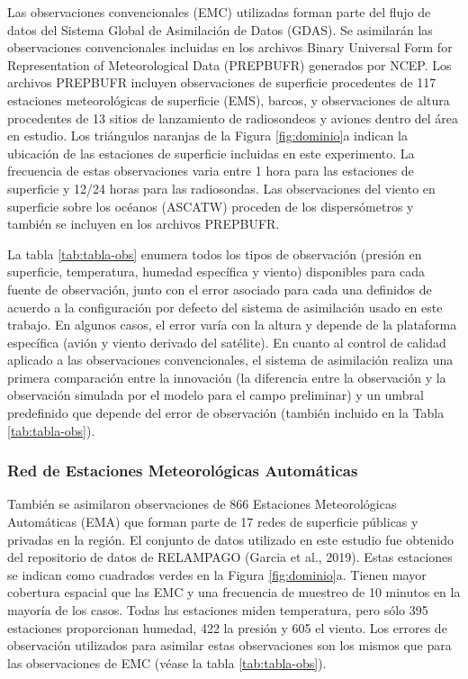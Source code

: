 \documentclass[12pt,oneside]{reedthesis}
\begin{document}
Las observaciones convencionales (EMC) utilizadas forman parte del flujo de datos del Sistema Global de Asimilación de Datos (GDAS). Se asimilarán las observaciones convencionales incluidas en los archivos Binary Universal Form for Representation of Meteorological Data (PREPBUFR) generados por NCEP. Los archivos PREPBUFR incluyen observaciones de superficie procedentes de 117 estaciones meteorológicas de superficie (EMS), barcos, y observaciones de altura procedentes de 13 sitios de lanzamiento de radiosondeos y aviones dentro del área en estudio. Los triángulos naranjas de la Figura \ref{fig:dominio}a indican la ubicación de las estaciones de superficie incluidas en este experimento. La frecuencia de estas observaciones varia entre 1 hora para las estaciones de superficie y 12/24 horas para las radiosondas. Las observaciones del viento en superficie sobre los océanos (ASCATW) proceden de los dispersómetros y también se incluyen en los archivos PREPBUFR.

La tabla \ref{tab:tabla-obs} enumera todos los tipos de observación (presión en superficie, temperatura, humedad específica y viento) disponibles para cada fuente de observación, junto con el error asociado para cada una definidos de acuerdo a la configuración por defecto del sistema de asimilación usado en este trabajo. En algunos casos, el error varía con la altura y depende de la plataforma específica (avión y viento derivado del satélite). En cuanto al control de calidad aplicado a las observaciones convencionales, el sistema de asimilación realiza una primera comparación entre la innovación (la diferencia entre la observación y la observación simulada por el modelo para el campo preliminar) y un umbral predefinido que depende del error de observación (también incluido en la Tabla \ref{tab:tabla-obs}).

\hypertarget{ema}{%
\subsubsection{Red de Estaciones Meteorológicas Automáticas}\label{ema}}

También se asimilaron observaciones de 866 Estaciones Meteorológicas Automáticas (EMA) que forman parte de 17 redes de superficie públicas y privadas en la región. El conjunto de datos utilizado en este estudio fue obtenido del repositorio de datos de RELAMPAGO (Garcia et al., 2019). Estas estaciones se indican como cuadrados verdes en la Figura \ref{fig:dominio}a. Tienen mayor cobertura espacial que las EMC y una frecuencia de muestreo de 10 minutos en la mayoría de los casos. Todas las estaciones miden temperatura, pero sólo 395 estaciones proporcionan humedad, 422 la presión y 605 el viento.
Los errores de observación utilizados para asimilar estas observaciones son los mismos que para las observaciones de EMC (véase la tabla \ref{tab:tabla-obs}).
\end{document}
